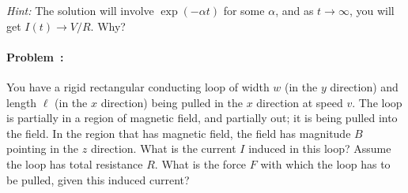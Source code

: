 \documentclass[12pt]{article}
\begin{document}
\textsl{Hint:} The solution will involve $\exp(-\alpha t)$ for some
$\alpha$, and as $t\rightarrow\infty$, you will get $I(t)\rightarrow
V/R$. Why?

\paragraph{Problem~\theproblem:}%
You have a rigid rectangular
conducting loop of width $w$ (in the $y$ direction) and length $\ell$
(in the $x$ direction) being pulled in the $x$ direction at speed
$v$. The loop is partially in a region of magnetic field, and
partially out; it is being pulled into the field. In
the region that has magnetic field, the field has magnitude $B$
pointing in the $z$ direction. What is the current $I$ induced in this
loop? Assume the loop has total resistance $R$.
What is the force $F$ with which the loop has to be pulled, given this induced current?
\end{document}
